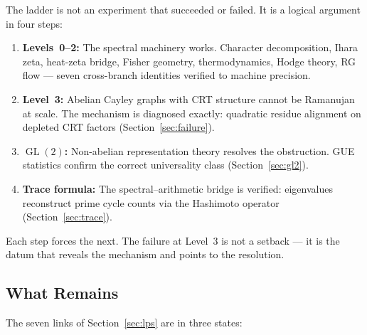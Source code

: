 \documentclass[12pt,reqno]{amsart}
\theoremstyle{plain}
\theoremstyle{definition}
\theoremstyle{remark}
\DeclareMathOperator{\GL}{GL}
\begin{document}
The ladder is not an experiment that succeeded or failed.  It is a
logical argument in four steps:
\begin{enumerate}[nosep]
  \item \textbf{Levels~0--2:} The spectral machinery works.  Character
    decomposition, Ihara zeta, heat-zeta bridge, Fisher geometry,
    thermodynamics, Hodge theory, RG flow --- seven cross-branch
    identities verified to machine precision.
  \item \textbf{Level~3:} Abelian Cayley graphs with CRT structure
    cannot be Ramanujan at scale.  The mechanism is diagnosed exactly:
    quadratic residue alignment on depleted CRT factors
    (Section~\ref{sec:failure}).
  \item \textbf{$\GL(2)$:} Non-abelian representation theory resolves
    the obstruction.  GUE statistics confirm the correct universality
    class (Section~\ref{sec:gl2}).
  \item \textbf{Trace formula:} The spectral--arithmetic bridge is
    verified: eigenvalues reconstruct prime cycle counts via the
    Hashimoto operator (Section~\ref{sec:trace}).
\end{enumerate}
Each step forces the next.  The failure at Level~3 is not a setback
--- it is the datum that reveals the mechanism and points to the
resolution.

\subsection{What Remains}

The seven links of Section~\ref{sec:lps} are in three states:
\end{document}
